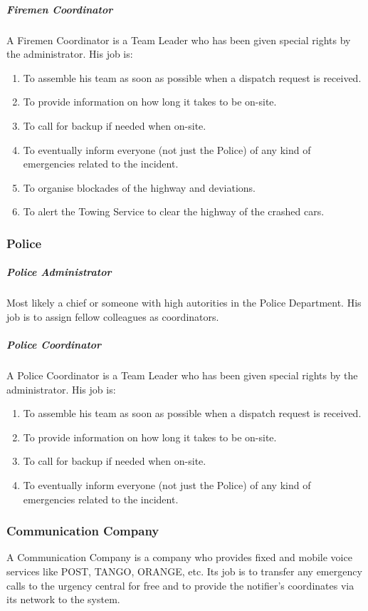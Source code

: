 \subparagraph{Firemen Coordinator}
A Firemen Coordinator is a Team Leader who has been given special
rights by the administrator. His job is:

\begin{enumerate}
\item To assemble his team as soon as possible when a dispatch request is
received.
\item To provide information on how long it takes to be on-site.
\item To call for backup if needed when on-site.
\item To eventually inform everyone (not just the Police) of any kind of
emergencies related to the incident.
\item To organise blockades of the highway and deviations.
\item To alert the Towing Service to clear the highway of the crashed cars.
\end{enumerate}

\subsubsection{Police}
\subparagraph{Police Administrator}
Most likely a chief or someone with high autorities in the Police Department.
His job is to assign fellow colleagues as coordinators.

\subparagraph{Police Coordinator}
A Police Coordinator is a Team Leader who has been given special
rights by the administrator. His job is:

\begin{enumerate}
\item To assemble his team as soon as possible when a dispatch request is
received.
\item To provide information on how long it takes to be on-site.
\item To call for backup if needed when on-site.
\item To eventually inform everyone (not just the Police) of any kind
of emergencies related to the incident.
\end{enumerate}


\subsubsection{Communication Company}
A Communication Company is a company who provides fixed and mobile voice
services like POST, TANGO, ORANGE, etc. Its job is to transfer any emergency
calls to the urgency central for free and to provide the notifier's
coordinates via its network to the system.


